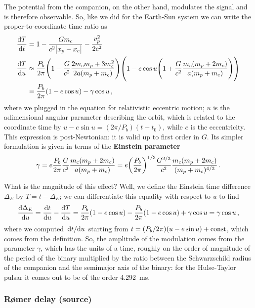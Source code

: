\documentclass[main.tex]{subfiles}
\begin{document}
The potential from the companion, on the other hand, modulates the signal and is therefore observable. So, like we did for the Earth-Sun system we can write the proper-to-coordinate time ratio as
%
\begin{subequations}
\begin{align}
\dv{T}{t} &= 1 - \frac{G m_c}{c^2 \abs{x_p - x_c}} - \frac{v_p^2}{2 c^2}  \\
\dv{T}{u} &\approx \frac{P_b}{2 \pi } \qty(1 - \frac{G}{c^2} \frac{2 m_c m_p + 3 m_c^2}{2 a (m_p + m_c)})\qty(1 - e \cos u \qty(1 + \frac{G}{c^2} \frac{m_c (m_p + 2 m_c)}{a (m_p + m_c)}))  \\
&= \frac{P_b}{2\pi } \qty(1 - e \cos u) - \gamma \cos u
\,,
\end{align}
\end{subequations}
%
where we plugged in the equation for relativistic eccentric motion; \(u\) is the adimensional angular parameter describing the orbit, which is related to the coordinate time by \(u - e \sin u = (2 \pi / P_b) (t - t_0 )\), while \(e\) is the eccentricity.
This expression is post-Newtonian: it is valid up to first order in \(G\).
Its simpler formulation is given in terms of the \textbf{Einstein parameter} 
%
\begin{align}
\gamma = e \frac{P_b}{2 \pi } \frac{G}{c^2} \frac{m_c (m_p + 2 m_c)}{a (m_p + m_c)}
= e \qty(\frac{P_b}{2 \pi })^{1/3} \frac{G^{2/3}}{c^2}  \frac{m_c (m_p + 2 m_c)}{(m_p + m_c)^{4/3}}
\,.
\end{align}

What is the magnitude of this effect? Well, we define the Einstein time difference \(\Delta_{E}\) by \(T = t - \Delta_{E}\); we can differentiate this equality with respect to \(u\) to find 
%
\begin{align}
\dv{ \Delta_{E}}{u} = \dv{t}{u} - \dv{T}{u}
= \frac{P_b}{2 \pi } \qty(1 - e \cos u) - 
\frac{P_b}{2\pi } \qty(1 - e \cos u) + \gamma \cos u = \gamma \cos u
\,,
\end{align}
%
where we computed \(\dv*{t}{u}\) starting from \(t = (P_b / 2\pi ) (u - e \sin u) + \text{const}\), which comes from the definition. 
So, the amplitude of the modulation comes from the parameter \(\gamma \), which has the units of a time, roughly on the order of magnitude of the period of the binary multiplied by the ratio between the Schwarzschild radius of the companion and the semimajor axis of the binary: for the Hulse-Taylor pulsar it comes out to be of the order \SI{4.292}{ms}.

\subsubsection{Rømer delay (source)}
\end{document}

